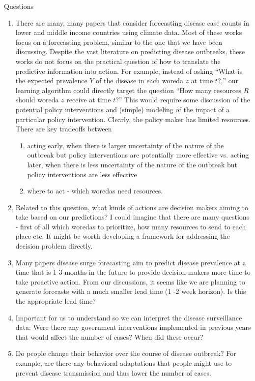 \documentclass{article}
\theoremstyle{definition}
\theoremstyle{plain}
\theoremstyle{remark}
\begin{document}
\begin{section}{Questions}

\begin{enumerate}
\item There are many, many papers that consider forecasting disease case counts in lower and middle income countries using climate data. Most of these works focus on a forecasting problem, similar to the one that we have been discussing. Despite the vast literature on predicting disease outbreaks, these works do not focus on the practical question of how to translate the predictive information into action. For example, instead of asking ``What is the expected prevalence $Y$ of the disease in each woreda $z$ at time $t$?,'' our learning algorithm could directly target the question ``How many resources $R$ should woreda $z$ receive at time $t$?'' This would require some discussion of the potential policy interventions and (simple) modeling of the impact of a particular policy intervention. Clearly, the policy maker has limited resources. There are key tradeoffs between 
\begin{enumerate}
  \item acting early, when there is larger uncertainty of the nature of the outbreak but policy interventions are potentially more effective vs. acting later, when there is less uncertainty of the nature of the outbreak but policy interventions are less effective
  \item where to act - which woredas need resources.
\end{enumerate}
\item  Related to this question, what kinds of actions are decision makers aiming to take based on our predictions? I could imagine that there are many questions - first of all which woredas to prioritize, how many resources to send to each place etc. It might be worth developing a framework for addressing the decision problem directly.
\item Many papers disease surge forecasting aim to predict disease prevalence at a time that is 1-3 months in the future to provide decision makers more time to take proactive action. From our discussions, it seems like we are planning to generate forecasts with a much smaller lead time (1 -2 week horizon). Is this the appropriate lead time?
\item Important for us to understand so we can interpret the disease surveillance data: Were there any government interventions implemented in previous years that would affect the number of cases? When did these occur?
\item Do people change their behavior over the course of disease outbreak? For example, are there any behavioral adaptations that people might use to prevent disease transmission and thus lower the number of cases.
\end{enumerate}

\end{section}


 

\end{document}
